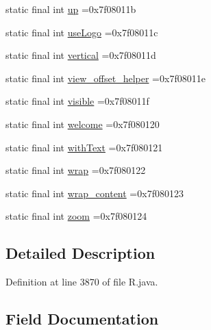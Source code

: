\begin{DoxyCompactItemize}
\item 
static final int \mbox{\hyperlink{classcom_1_1example_1_1trainawearapplication_1_1_r_1_1id_a0189e0bd877b82691ccb8a713ae8cebd}{up}} =0x7f08011b
\item 
static final int \mbox{\hyperlink{classcom_1_1example_1_1trainawearapplication_1_1_r_1_1id_a09770bf839d35bd3a16d4db282c3171d}{use\+Logo}} =0x7f08011c
\item 
static final int \mbox{\hyperlink{classcom_1_1example_1_1trainawearapplication_1_1_r_1_1id_ac228299dd90ce1f01345df78f11104f3}{vertical}} =0x7f08011d
\item 
static final int \mbox{\hyperlink{classcom_1_1example_1_1trainawearapplication_1_1_r_1_1id_a10f335198e8398033f8f102bb31cace2}{view\+\_\+offset\+\_\+helper}} =0x7f08011e
\item 
static final int \mbox{\hyperlink{classcom_1_1example_1_1trainawearapplication_1_1_r_1_1id_a935bdaf20a266bda5c6533467a6bceed}{visible}} =0x7f08011f
\item 
static final int \mbox{\hyperlink{classcom_1_1example_1_1trainawearapplication_1_1_r_1_1id_a5a2086d9f997358f69c42b0ec34d9420}{welcome}} =0x7f080120
\item 
static final int \mbox{\hyperlink{classcom_1_1example_1_1trainawearapplication_1_1_r_1_1id_af0cbdc1ecaa424508b0adba2ac184a6e}{with\+Text}} =0x7f080121
\item 
static final int \mbox{\hyperlink{classcom_1_1example_1_1trainawearapplication_1_1_r_1_1id_a44c96738ce8a6f2d05c867f23472d5a2}{wrap}} =0x7f080122
\item 
static final int \mbox{\hyperlink{classcom_1_1example_1_1trainawearapplication_1_1_r_1_1id_a94e3292068723259badfe3bc83346edc}{wrap\+\_\+content}} =0x7f080123
\item 
static final int \mbox{\hyperlink{classcom_1_1example_1_1trainawearapplication_1_1_r_1_1id_a838c0b7d254c3014a422248b4721b39e}{zoom}} =0x7f080124
\end{DoxyCompactItemize}


\subsection{Detailed Description}


Definition at line 3870 of file R.\+java.



\subsection{Field Documentation}
\mbox{\label{classcom_1_1example_1_1trainawearapplication_1_1_r_1_1id_a6c80202eeccc7e6ceab24d9e82509bb9}} 
